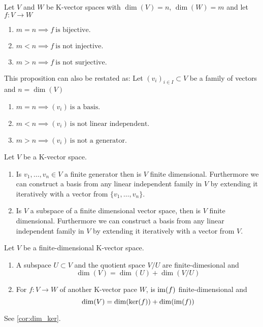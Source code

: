 \begin{proposition}\label{pro:dim_f}
   Let \(V\) and \(W\) be K-vector spaces with \(\dim(V) = n\), \(\dim(W) = m\) and let \(f: V \to W\)

   \begin{enumerate}[label=\roman*, align=Center]
      \item \(m = n \implies f~\text{is bijective.}\)
      \item \(m < n \implies f~\text{is not injective.}\)
      \item \(m > n \implies f~\text{is not surjective.}\)
   \end{enumerate}
\end{proposition}
\begin{remark}
   This proposition can also be restated as:
   Let \((v_i)_{i \in I} \subset V\) be a family of vectors and \(n = \dim(V)\)
   \begin{enumerate}[label=\roman*, align=Center]
      \item \(m = n \implies (v_i)~\text{is a basis.}\)
      \item \(m < n \implies (v_i)~\text{is not linear independent.}\)
      \item \(m > n \implies (v_i)~\text{is not a generator.}\)
   \end{enumerate}
\end{remark}

\begin{proposition}\label{pro:extending_family}
   Let \(V\) be a K-vector space.
   \begin{enumerate}[label=\roman*, align=Center]
      \item Is \(v_1, \ldots, v_n \in V\) a finite generator then is \(V\) finite dimensional.
         Furthermore we can construct a basis from any linear independent family in \(V\) by extending it iteratively with a vector from \(\{v_1, \ldots, v_n\}\).
      \item Is \(V\) a subspace of a finite dimensional vector space, then is \(V\) finite dimensional.
         Furthermore we can construct a basis from any linear independent family in \(V\) by extending it iteratively with a vector from \(V\).
   \end{enumerate}
\end{proposition}

\begin{proposition}\label{pro:dimesion_formulas}
   Let \(V\) be a finite-dimensional K-vector space.
   \begin{enumerate}[label=\roman*, align=Center]
      \item A subspace \(U \subset V\) and the quotient space \(V/U\) are finite-dimesional and
         \[\dim(V) = \dim(U) + \dim(V/U)\]
      \item For \(f: V \to W\) of another K-vector pace \(W\), is \(\operatorname{im}(f)\) finite-dimensional and
         \[\dim(V) = \dim(\ker(f)) + \dim(\operatorname{im}(f))\]
   \end{enumerate}
\end{proposition}
\begin{remark}
   See \cref{cor:dim_ker}.
\end{remark}

